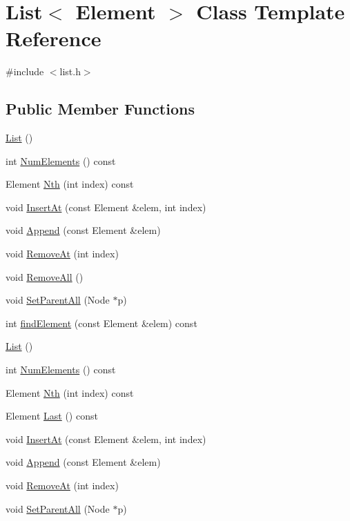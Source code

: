 \hypertarget{classList}{
\section{List$<$ Element $>$ Class Template Reference}
\label{classList}
}


{\ttfamily \#include $<$list.h$>$}

\subsection*{Public Member Functions}
\begin{DoxyCompactItemize}
\item 
\hyperlink{classList_acdfa9a2a43d22f973fe2ecc55318847a}{List} ()
\item 
int \hyperlink{classList_ac2e9d50f703b01bf643fa6ce50837c26}{NumElements} () const 
\item 
Element \hyperlink{classList_a5eb964816de33c85e1d46658ddf8c6c4}{Nth} (int index) const 
\item 
void \hyperlink{classList_a8d86a82c138b259da6fa0d046aed985b}{InsertAt} (const Element \&elem, int index)
\item 
void \hyperlink{classList_a473190098e38206d0125b0737245e613}{Append} (const Element \&elem)
\item 
void \hyperlink{classList_af17f72d263f90d53ea8501b5b1853470}{RemoveAt} (int index)
\item 
void \hyperlink{classList_a03ba0aa559b433acbbe1a147cf9ca905}{RemoveAll} ()
\item 
void \hyperlink{classList_ae461121db8d03106e92af9f87fa68b7d}{SetParentAll} (Node $\ast$p)
\item 
int \hyperlink{classList_a1e4827f5ca5d028662f6425f095e75c7}{findElement} (const Element \&elem) const 
\item 
\hyperlink{classList_acdfa9a2a43d22f973fe2ecc55318847a}{List} ()
\item 
int \hyperlink{classList_ac2e9d50f703b01bf643fa6ce50837c26}{NumElements} () const 
\item 
Element \hyperlink{classList_a5eb964816de33c85e1d46658ddf8c6c4}{Nth} (int index) const 
\item 
Element \hyperlink{classList_a6d48ac6d8dc07d30d726298dd60b5b03}{Last} () const 
\item 
void \hyperlink{classList_a8d86a82c138b259da6fa0d046aed985b}{InsertAt} (const Element \&elem, int index)
\item 
void \hyperlink{classList_a473190098e38206d0125b0737245e613}{Append} (const Element \&elem)
\item 
void \hyperlink{classList_af17f72d263f90d53ea8501b5b1853470}{RemoveAt} (int index)
\item 
void \hyperlink{classList_ae461121db8d03106e92af9f87fa68b7d}{SetParentAll} (Node $\ast$p)
\end{DoxyCompactItemize}
